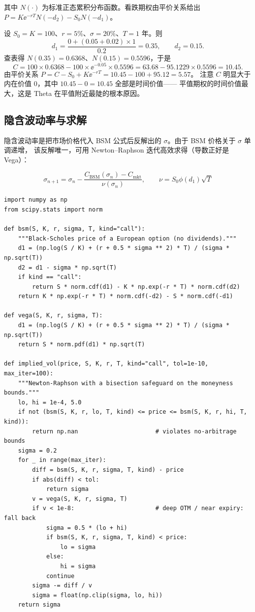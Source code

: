 其中 $N(\cdot)$ 为标准正态累积分布函数。看跌期权由平价关系给出
$P = K\ee^{-rT}N(-d_2) - S_0N(-d_1)$。

\begin{example}[平值期权的定价与计算复核]\label{ex:04-bsm}
设 $S_0 = K = 100$、$r = 5\%$、$\sigma = 20\%$、$T = 1$ 年。则
\[
  d_1 = \frac{0 + (0.05+0.02)\times 1}{0.2} = 0.35,\qquad d_2 = 0.15.
\]
查表得 $N(0.35) = 0.6368$、$N(0.15) = 0.5596$，于是
\[
  C = 100\times0.6368 - 100\times\ee^{-0.05}\times0.5596
    = 63.68 - 95.1229\times0.5596 = 10.45.
\]
由平价关系 $P = C - S_0 + K\ee^{-rT} = 10.45 - 100 + 95.12 = 5.57$。
注意 $C$ 明显大于内在价值 $0$，其中 $10.45 - 0 = 10.45$ 全部是时间价值——
平值期权的时间价值最大，这是 Theta 在平值附近最陡的根本原因。
\end{example}

\subsection{隐含波动率与求解}

隐含波动率是把市场价格代入 BSM 公式后反解出的 $\sigma$。由于 BSM 价格关于 $\sigma$ 单调递增，
该反解唯一，可用 Newton--Raphson 迭代高效求得（导数正好是 Vega）：

\begin{equation}
  \sigma_{n+1} = \sigma_n - \frac{C_{\text{BSM}}(\sigma_n) - C_{\text{mkt}}}{\nu(\sigma_n)},
  \qquad \nu = S_0\phi(d_1)\sqrt{T}
  \label{eq:04-newton}
\end{equation}

\begin{lstlisting}[style=pythonstyle, caption={BSM 定价与 Newton 法反解隐含波动率}, label={lst:04-iv}]
import numpy as np
from scipy.stats import norm

def bsm(S, K, r, sigma, T, kind="call"):
    """Black-Scholes price of a European option (no dividends)."""
    d1 = (np.log(S / K) + (r + 0.5 * sigma ** 2) * T) / (sigma * np.sqrt(T))
    d2 = d1 - sigma * np.sqrt(T)
    if kind == "call":
        return S * norm.cdf(d1) - K * np.exp(-r * T) * norm.cdf(d2)
    return K * np.exp(-r * T) * norm.cdf(-d2) - S * norm.cdf(-d1)

def vega(S, K, r, sigma, T):
    d1 = (np.log(S / K) + (r + 0.5 * sigma ** 2) * T) / (sigma * np.sqrt(T))
    return S * norm.pdf(d1) * np.sqrt(T)

def implied_vol(price, S, K, r, T, kind="call", tol=1e-10, max_iter=100):
    """Newton-Raphson with a bisection safeguard on the moneyness bounds."""
    lo, hi = 1e-4, 5.0
    if not (bsm(S, K, r, lo, T, kind) <= price <= bsm(S, K, r, hi, T, kind)):
        return np.nan                      # violates no-arbitrage bounds
    sigma = 0.2
    for _ in range(max_iter):
        diff = bsm(S, K, r, sigma, T, kind) - price
        if abs(diff) < tol:
            return sigma
        v = vega(S, K, r, sigma, T)
        if v < 1e-8:                       # deep OTM / near expiry: fall back
            sigma = 0.5 * (lo + hi)
            if bsm(S, K, r, sigma, T, kind) < price:
                lo = sigma
            else:
                hi = sigma
            continue
        sigma -= diff / v
        sigma = float(np.clip(sigma, lo, hi))
    return sigma
\end{lstlisting}

